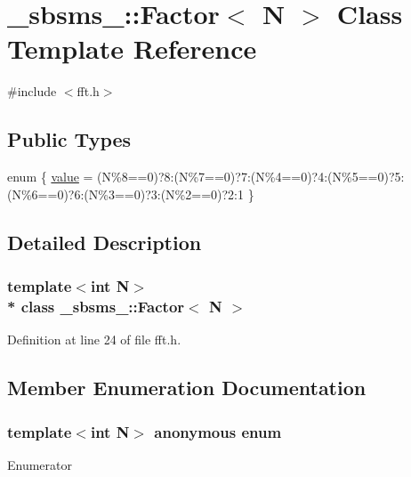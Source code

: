 \hypertarget{class__sbsms___1_1_factor}{}\section{\+\_\+sbsms\+\_\+\+:\+:Factor$<$ N $>$ Class Template Reference}
\label{class__sbsms___1_1_factor}


{\ttfamily \#include $<$fft.\+h$>$}

\subsection*{Public Types}
\begin{DoxyCompactItemize}
\item 
enum \{ \hyperlink{class__sbsms___1_1_factor_adac83c3ecdb05eb197f43da47c04f8cba61777a95d47c41073975bab2af9650b2}{value} = (N\%8==0)?8\+:(N\%7==0)?7\+:(N\%4==0)?4\+:(N\%5==0)?5\+:(N\%6==0)?6\+:(N\%3==0)?3\+:(N\%2==0)?2\+:1
 \}
\end{DoxyCompactItemize}


\subsection{Detailed Description}
\subsubsection*{template$<$int N$>$\\*
class \+\_\+sbsms\+\_\+\+::\+Factor$<$ N $>$}



Definition at line 24 of file fft.\+h.



\subsection{Member Enumeration Documentation}
\subsubsection[{\texorpdfstring{anonymous enum}{anonymous enum}}]{\setlength{\rightskip}{0pt plus 5cm}template$<$int N$>$ anonymous enum}\hypertarget{class__sbsms___1_1_factor_adac83c3ecdb05eb197f43da47c04f8cb}{}\label{class__sbsms___1_1_factor_adac83c3ecdb05eb197f43da47c04f8cb}
\begin{Desc}
\item[Enumerator]\par
\begin{description}
\item[{\em 
value\hypertarget{class__sbsms___1_1_factor_adac83c3ecdb05eb197f43da47c04f8cba61777a95d47c41073975bab2af9650b2}{}\label{class__sbsms___1_1_factor_adac83c3ecdb05eb197f43da47c04f8cba61777a95d47c41073975bab2af9650b2}
}]\end{description}
\end{Desc}


